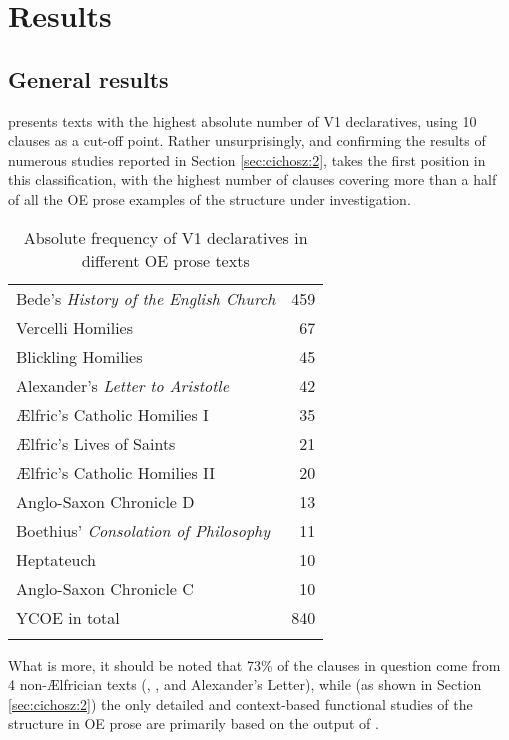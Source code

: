 \documentclass[output=paper,colorlinks,citecolor=brown]{langscibook}
\begin{document}
\largerpage
\section{Results}
\label{sec:cichosz:4}

\subsection{General results}
\label{sec:cichosz:4.1}
 presents  texts with the highest absolute number of V1 declaratives, using 10 clauses as a cut-off point. Rather unsurprisingly, and confirming the results of numerous studies reported in Section \ref{sec:cichosz:2},  takes the first position in this classification, with the highest number of clauses covering more than a half of all the OE prose examples of the structure under investigation.

\begin{table}
\begin{tabularx}{0.6\textwidth}{Xr}
\lsptoprule
Bede's \textit{History of the English Church}  & {459}\\
Vercelli Homilies & {67}\\
Blickling Homilies & {45}\\
Alexander's \textit{Letter to Aristotle} & { 42}\\
Ælfric's Catholic Homilies I  & {35}\\
Ælfric's Lives of Saints  & {21}\\
Ælfric's Catholic Homilies II  & {20}\\
Anglo-Saxon Chronicle D & {13}\\
Boethius' \textit{Consolation of Philosophy}  & {11}\\
Heptateuch & {10}\\
Anglo-Saxon Chronicle C & {10}\\
YCOE in total & {840}\\
\lspbottomrule
\end{tabularx}
\caption{Absolute frequency of V1 declaratives in different OE prose texts}
\label{tab:cichosz:1}
\end{table}

What is more, it should be noted that 73\% of the clauses in question come from 4 non-Ælfrician texts (, ,  and Alexander's Letter), while (as shown in Section \ref{sec:cichosz:2}) the only detailed and context-based functional studies of the structure in OE prose are primarily based on the output of . 
\end{document}
